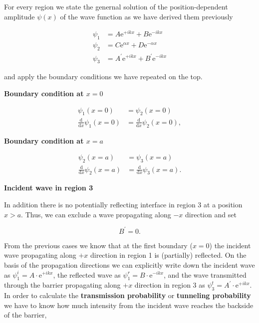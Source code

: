 \documentclass[
  a4paper,
]{book}
\begin{document}
For every region we state the genernal solution of the
position-dependent amplitude \(\psi \left( x \right)\) of the wave
function as we have derived them previously

\[
\begin{aligned}
\psi_1 & =  A \mathrm{e}^{+i k x} + B \mathrm{e}^{-i k x}\\
\psi_2 & =  C \mathrm{e}^{\alpha x} + D \mathrm{e}^{-\alpha x}\\
\psi_3 & =  A^{\prime} \mathrm{e}^{+i k x} + B^{\prime} \mathrm{e}^{-i k x}
\end{aligned}
\]

and apply the boundary conditions we have repeated on the top.

\textbf{Boundary condition at \(x = 0\)}

\[
\begin{aligned}
\psi_1 \left( x = 0 \right) & =  \psi_2 \left( x = 0 \right)\\
\frac{\mathrm{d}}{\mathrm{d}x} \psi_1 \left( x = 0 \right) & =  \frac{\mathrm{d}}{\mathrm{d}x} \psi_2 \left( x = 0 \right) \mathrm{,}
\end{aligned}
\]

\textbf{Boundary condition at \(x = a\)}

\[
\begin{aligned}
\psi_2 \left( x = a \right) & =  \psi_3 \left( x = a \right)\\
\frac{\mathrm{d}}{\mathrm{d}x} \psi_2 \left( x = a \right) & =  \frac{\mathrm{d}}{\mathrm{d}x} \psi_3 \left( x = a \right) \mathrm{.}
\end{aligned}
\]

\textbf{Incident wave in region 3}

In addition there is no potentially reflecting interface in region 3 at
a position \(x > a\). Thus, we can exclude a wave propagating along
\(-x\) direction and set

\[
B^{\prime} = 0 \mathrm{.}
\]

From the previous cases we know that at the first boundary (\(x=0\)) the
incident wave propagating along \(+x\) direction in region 1 is
(partially) reflected. On the basis of the propagation directions we can
explicitly write down the incident wave as
\(\psi_{1}^{i} = A \cdot \mathrm{e}^{+i k x}\), the reflected wave as
\(\psi_{1}^{r} = B \cdot \mathrm{e}^{-i k x}\), and the wave transmitted
through the barrier propagating along \(+x\) direction in region 3 as
\(\psi_{3}^{t} = A^{\prime} \cdot \mathrm{e}^{+i k x}\). In order to
calculate the \textbf{transmission probability} or \textbf{tunneling
probability} we have to know how much intensity from the incident wave
reaches the backside of the barrier,
\end{document}
